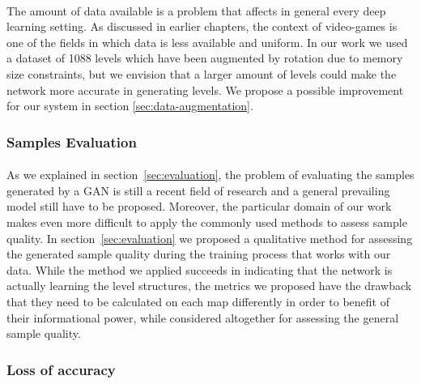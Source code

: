 \paragraph{} The amount of data available is a problem that affects in general every deep learning setting. As discussed in earlier chapters, the context of video-games is one of the fields in which data is less available and uniform. In our work we used a dataset of 1088 levels which have been augmented by rotation due to memory size constraints, but we envision that a larger amount of levels could make the network more accurate in generating levels. We propose a possible improvement for our system in section \ref{sec:data-augmentation}.
\subsubsection{Samples Evaluation}
\paragraph{} As we explained in section~\ref{sec:evaluation}, the problem of evaluating the samples generated by a GAN is still a recent field of research and a general prevailing model still have to be proposed. Moreover, the particular domain of our work makes even more difficult to apply the commonly used methods to assess sample quality. In section~\ref{sec:evaluation} we proposed a qualitative method for assessing the generated sample quality during the training process that works with our data. While the method we applied succeeds in indicating that the network is actually learning the level structures, the metrics we proposed have the drawback that they need to be calculated on each map differently in order to benefit of their informational power, while considered altogether for assessing the general sample quality. 

\subsubsection{Loss of accuracy}
